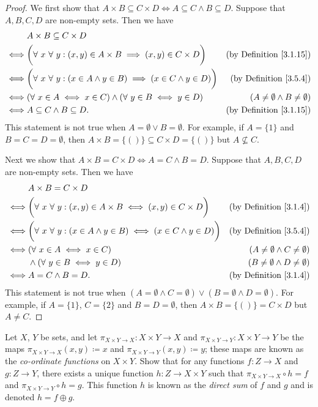 \begin{proof}
We first show that \(A \times B \subseteq C \times D \iff A \subseteq C \land B \subseteq D\).
Suppose that \(A, B, C, D\) are non-empty sets.
Then we have
\begin{align*}
& A \times B \subseteq C \times D \\
\iff & \bigg(\forall\ x \ \forall\ y : (x, y) \in A \times B \implies (x, y) \in C \times D\bigg) & \text{(by Definition \ref{3.1.15})} \\
\iff & \bigg(\forall\ x \ \forall\ y :(x \in A \land y \in B) \implies (x \in C \land y \in D)\bigg) & \text{(by Definition \ref{3.5.4})} \\
\iff & (\forall\ x \in A \iff x \in C) \land (\forall\ y \in B \iff y \in D) & (A \neq \emptyset \land B \neq \emptyset) \\
\iff & A \subseteq C \land B \subseteq D. & \text{(by Definition \ref{3.1.15})}
\end{align*}
This statement is not true when \(A = \emptyset \lor B = \emptyset\).
For example, if \(A = \{1\}\) and \(B = C = D = \emptyset\), then \(A \times B = \{()\} \subseteq C \times D = \{()\}\) but \(A \not \subseteq C\).

Next we show that \(A \times B = C \times D \iff A = C \land B = D\).
Suppose that \(A, B, C, D\) are non-empty sets.
Then we have
\begin{align*}
& A \times B = C \times D \\
\iff & \bigg(\forall\ x \ \forall\ y : (x, y) \in A \times B \iff (x, y) \in C \times D\bigg) & \text{(by Definition \ref{3.1.4})} \\
\iff & \bigg(\forall\ x \ \forall\ y : (x \in A \land y \in B) \iff (x \in C \land y \in D)\bigg) & \text{(by Definition \ref{3.5.4})} \\
\iff & (\forall\ x \in A \iff x \in C) & (A \neq \emptyset \land C \neq \emptyset) \\
& \land (\forall\ y \in B \iff y \in D) & (B \neq \emptyset \land D \neq \emptyset) \\
\iff & A = C \land B = D. & \text{(by Definition \ref{3.1.4})}
\end{align*}
This statement is not true when \((A = \emptyset \land C = \emptyset) \lor (B = \emptyset \land D = \emptyset)\).
For example, if \(A = \{1\}\), \(C = \{2\}\) and \(B = D = \emptyset\), then \(A \times B = \{()\} = C \times D\) but \(A \neq C\).
\end{proof}

\begin{exercise}\label{ex 3.5.7}
Let \(X\), \(Y\) be sets, and let \(\pi_{X \times Y \to X} : X \times Y \to X\) and \(\pi_{X \times Y \to Y} : X \times Y \to Y\) be the maps \(\pi_{X \times Y \to X}(x, y) \coloneqq x\) and \(\pi_{X \times Y \to Y}(x, y) \coloneqq y\);
these maps are known as the \emph{co-ordinate functions} on \(X \times Y\).
Show that for any functions \(f : Z \to X\) and \(g : Z \to Y\), there exists a unique function \(h : Z \to X \times Y\) such that \(\pi_{X \times Y \to X} \circ h = f\) and \(\pi_{X \times Y \to Y} \circ h = g\).
This function \(h\) is known as the \emph{direct sum} of \(f\) and \(g\) and is denoted \(h = f \oplus g\).
\end{exercise}


